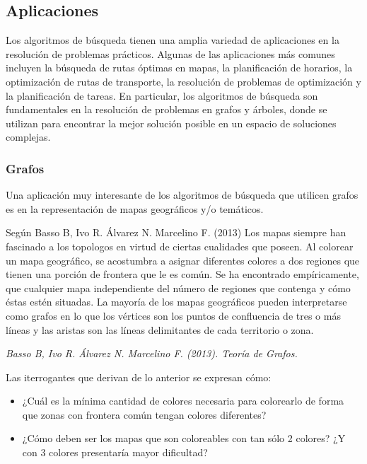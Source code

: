 \documentclass[11pt, a4paper]{article}
\begin{document}
\newpage

\subsection{Aplicaciones}

Los algoritmos de búsqueda tienen una amplia variedad de aplicaciones en la resolución de problemas prácticos. Algunas de las aplicaciones más comunes incluyen la búsqueda de rutas óptimas en mapas, la planificación de horarios, la optimización de rutas de transporte, la resolución de problemas de optimización y la planificación de tareas. En particular, los algoritmos de búsqueda son fundamentales en la resolución de problemas en grafos y árboles, donde se utilizan para encontrar la mejor solución posible en un espacio de soluciones complejas.

\subsubsection{Grafos}

  Una aplicación muy interesante de los algoritmos de búsqueda que utilicen grafos es en la representación de mapas geográficos y/o temáticos.
  
  Según Basso B, Ivo R. Álvarez N. Marcelino F. (2013) Los mapas siempre han fascinado a los topologos en virtud de ciertas cualidades que poseen. Al colorear un mapa geográfico, se acostumbra a asignar diferentes colores a dos regiones que tienen una porción de frontera que le es común. Se ha encontrado empíricamente, que cualquier mapa independiente del número de regiones que contenga y cómo éstas estén situadas. La mayoría de los mapas geográficos pueden interpretarse como grafos en lo que los vértices son los puntos de confluencia de tres o más líneas y las aristas son las líneas delimitantes de cada territorio o zona.

  \begin{flushright}
    \textit{Basso B, Ivo R. Álvarez N. Marcelino F. (2013). Teoría de Grafos.}
  \end{flushright}

  Las iterrogantes que derivan de lo anterior se expresan cómo:

  \begin{itemize}
    \item ¿Cuál es la mínima cantidad de colores necesaria para colorearlo de forma que zonas con frontera común tengan colores diferentes?
    \item ¿Cómo deben ser los mapas que son coloreables con tan sólo 2 colores? ¿Y con 3 
    colores presentaría mayor dificultad?
  \end{itemize}
\end{document}
